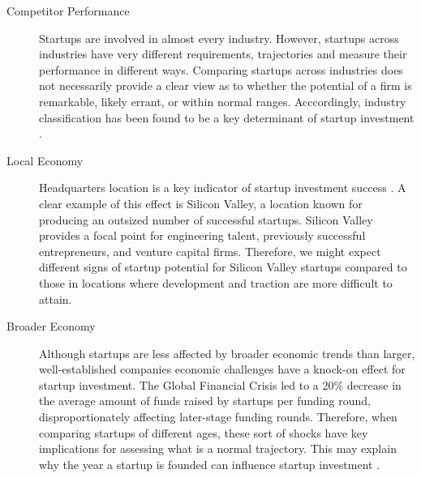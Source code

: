 \begin{description}

\item[Competitor Performance]

Startups are involved in almost every industry. However, startups across industries have very different requirements, trajectories and measure their performance in different ways. Comparing startups across industries does not necessarily provide a clear view as to whether the potential of a firm is remarkable, likely errant, or within normal ranges. Acccordingly, industry classification has been found to be a key determinant of startup investment \cite{shan2014,croce2016,gimmon2010}.

\item[Local Economy]

Headquarters location is a key indicator of startup investment success \cite{beckwith2016,croce2016,gimmon2010}. A clear example of this effect is Silicon Valley, a location known for producing an outsized number of successful startups. Silicon Valley provides a focal point for engineering talent, previously successful entrepreneurs, and venture capital firms. Therefore, we might expect different signs of startup potential for Silicon Valley startups compared to those in locations where development and traction are more difficult to attain.

\item[Broader Economy]

Although startups are less affected by broader economic trends than larger, well-established companies economic challenges have a knock-on effect for startup investment. The Global Financial Crisis led to a 20\% decrease in the average amount of funds raised by startups per funding round, disproportionately affecting later-stage funding rounds. Therefore, when comparing startups of different ages, these sort of shocks have key implications for assessing what is a normal trajectory. This may explain why the year a startup is founded can influence startup investment \cite{croce2016,hoenen2014}.

\end{description}
